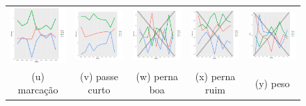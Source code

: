 \documentclass[doc,apacite,oneside,a4paper,12pt]{apa6}
\begin{document}
\begin{figure}
\begin{tabular}{ccccc}
   \includegraphics[width=25mm]{marcacao_result} & \includegraphics[width=25mm]{passecurto_result}   &   \includegraphics[width=25mm]{pernaboa_result}&
  \includegraphics[width=25mm]{pernaruim_result}   & \includegraphics[width=25mm]{peso_result}   \\
 \scriptsize{(u) marcação} & \scriptsize{(v) passe curto } & \scriptsize{(w) perna boa} & \scriptsize{(x) perna ruim} & \scriptsize{(y) peso}\\[3pt]
 

\end{tabular}
\end{figure}
\end{document}
